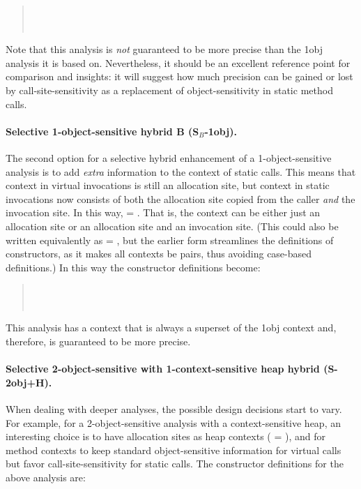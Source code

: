 \begin{quote}
 \\
 \\
\end{quote}

Note that this analysis is \emph{not} guaranteed to be more precise than the 1obj analysis it is based on. Nevertheless, it should be an excellent reference point for comparison and insights: it will suggest how much precision can be gained or lost by call-site-sensitivity as a replacement of object-sensitivity in static method calls.

\paragraph{Selective 1-object-sensitive hybrid B (S$_B$-1obj).}
The second option for a selective hybrid enhancement of a 1-object-sensitive analysis is to add \emph{extra} information to the context of static calls. This means that context in virtual invocations is still an allocation site, but context in static invocations now consists of both the allocation site copied from the caller \emph{and} the invocation site. In this way,  = . That is, the context can be either just an allocation site or an allocation site and an invocation site. (This could also be written equivalently as  = , but the earlier form streamlines the definitions of constructors, as it makes all contexts be pairs, thus avoiding case-based definitions.)  In this way the constructor definitions become:

\begin{quote}
 \\
 \\
\end{quote}

This analysis has a context that is always a superset of the 1obj context and, therefore, is guaranteed to be more precise.

\paragraph{Selective 2-object-sensitive with 1-context-sensitive heap hybrid (S-2obj+H).}
When dealing with deeper analyses, the possible design decisions start to vary. For example, for a 2-object-sensitive analysis with a context-sensitive heap, an interesting choice is to have allocation sites as heap contexts ( = ), and for method contexts to keep standard object-sensitive information for virtual calls but favor call-site-sensitivity for static calls. The constructor definitions for the above analysis are:

